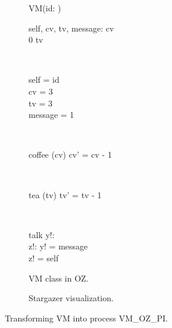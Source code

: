 \begin{figure}[H]
\begin{subfigure}{.6\textwidth}
\centering
\begin{class}{VM(id: \integer)}
\\
\begin{state}
self, cv, tv, message: \integer
{} \leq  cv 
\\
0 \leq  tv 
\end{state} 
\\
\begin{init}
self = id
\\cv = 3
\\tv = 3
\\message = 1
\end{init} 
\\
\begin{op}{coffee}
\Delta (cv)
\ST
cv' = cv - 1
\end{op}
\\
\begin{op}{tea}
\Delta (tv)
\ST
tv' = tv - 1
\end{op}
\\
\begin{op}{talk}
y!: \integer
\\z!: \integer
\ST
y! = message
\\z! = self
\end{op}
\end{class}
  \caption{VM class in OZ.}
\end{subfigure}%
\begin{subfigure}{.4\textwidth}
  \centering
{}
  \caption{Stargazer visualization.}
\end{subfigure}
\caption{Transforming VM into \picalc{} process VM\_OZ\_PI.}
\label{tra_vm_OZ}
\end{figure}

